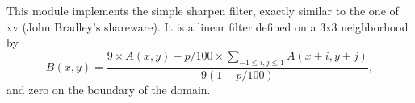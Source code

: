 This module implements the simple sharpen filter, exactly similar to
the one of xv (John Bradley's shareware). It is a linear filter
defined on a 3x3 neighborhood by
$$ B(x,y) = 
\frac{\displaystyle 9 \times A(x,y) - p/100 \times \sum_{-1\leq i,j\leq 1}A(x+i,y+j)}{9(1-p/100)},$$
and zero on the boundary of the domain.


